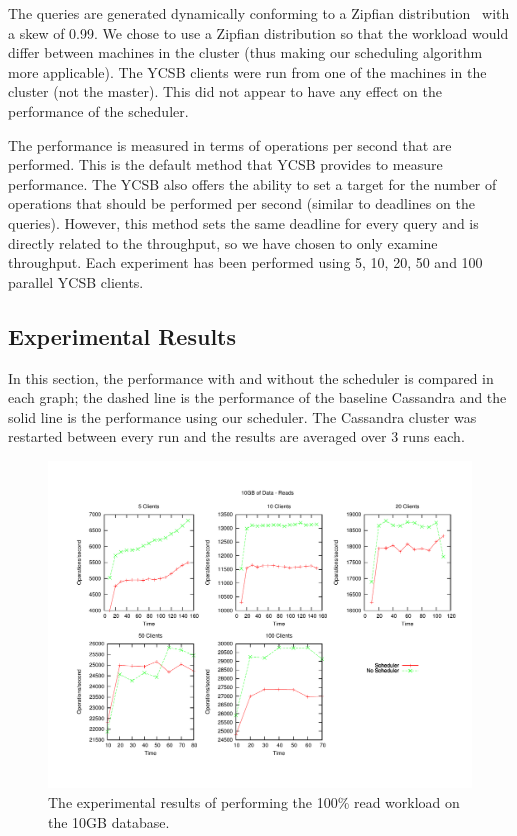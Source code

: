 \documentclass[]{acm_proc_article-sp}
\begin{document}
The queries are generated dynamically conforming to a Zipfian distribution~\cite{Quckly Generating Billion-Record Synthetic Databases} with a skew of 0.99. We chose to use a Zipfian distribution so that the workload would differ between machines in the cluster (thus making our scheduling algorithm more applicable). The YCSB clients were run from one of the machines in the cluster (not the master). This did not appear to have any effect on the performance of the scheduler. 

The performance is measured in terms of operations per second that are performed. This is the default method that YCSB provides to measure performance. The YCSB also offers the ability to set a target for the number of operations that should be performed per second (similar to deadlines on the queries). However, this method sets the same deadline for every query and is directly related to the throughput, so we have chosen to only examine throughput. Each experiment has been performed using 5, 10, 20, 50 and 100 parallel YCSB clients.

\subsection{Experimental Results}
In this section, the performance with and without the scheduler is compared in each graph; the dashed line is the performance of the baseline Cassandra and the solid line is the performance using our scheduler. The Cassandra cluster was restarted between every run and the results are averaged over 3 runs each.

\begin{figure}[t]
\centering
\includegraphics[scale=0.63]{images/10GB_Reads.pdf}
\vspace{-15pt}
\caption{The experimental results of performing the 100\% read workload on the 10GB database.}
\label{fig:10g_reads}
\end{figure}
\end{document}
